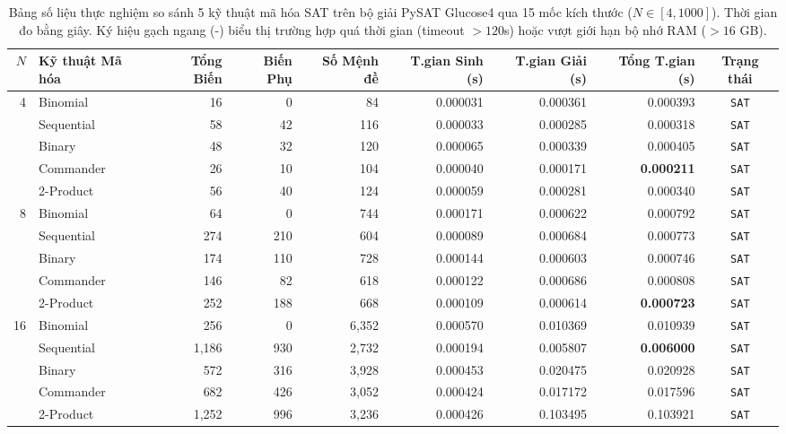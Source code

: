 \documentclass[a4paper,fleqn]{cas-sc}
\begin{document}
\begin{table}[t]
\centering
\caption{Bảng số liệu thực nghiệm so sánh 5 kỹ thuật mã hóa SAT trên bộ giải PySAT Glucose4 qua 15 mốc kích thước ($N \in [4, 1000]$). Thời gian đo bằng giây. Ký hiệu gạch ngang (-) biểu thị trường hợp quá thời gian (timeout $> 120$s) hoặc vượt giới hạn bộ nhớ RAM ($> 16$ GB).}
\label{tab:sat_encodings_results}
\scriptsize
\setlength{\tabcolsep}{3.5pt}
\begin{tabular*}{\textwidth}{@{\extracolsep{\fill}} r l r r r r r r c @{}}
\toprule
$N$ & \textbf{Kỹ thuật Mã hóa} & \textbf{Tổng Biến} & \textbf{Biến Phụ} & \textbf{Số Mệnh đề} & \textbf{T.gian Sinh (s)} & \textbf{T.gian Giải (s)} & \textbf{Tổng T.gian (s)} & \textbf{Trạng thái} \\
\midrule
\multirow{5}{*}{4} 
 & Binomial & 16 & 0 & 84 & 0.000031 & 0.000361 & 0.000393 & \texttt{SAT} \\
 & Sequential & 58 & 42 & 116 & 0.000033 & 0.000285 & 0.000318 & \texttt{SAT} \\
 & Binary & 48 & 32 & 120 & 0.000065 & 0.000339 & 0.000405 & \texttt{SAT} \\
 & Commander & 26 & 10 & 104 & 0.000040 & 0.000171 & \textbf{0.000211} & \texttt{SAT} \\
 & 2-Product & 56 & 40 & 124 & 0.000059 & 0.000281 & 0.000340 & \texttt{SAT} \\
\midrule
\multirow{5}{*}{8} 
 & Binomial & 64 & 0 & 744 & 0.000171 & 0.000622 & 0.000792 & \texttt{SAT} \\
 & Sequential & 274 & 210 & 604 & 0.000089 & 0.000684 & 0.000773 & \texttt{SAT} \\
 & Binary & 174 & 110 & 728 & 0.000144 & 0.000603 & 0.000746 & \texttt{SAT} \\
 & Commander & 146 & 82 & 618 & 0.000122 & 0.000686 & 0.000808 & \texttt{SAT} \\
 & 2-Product & 252 & 188 & 668 & 0.000109 & 0.000614 & \textbf{0.000723} & \texttt{SAT} \\
\midrule
\multirow{5}{*}{16} 
 & Binomial & 256 & 0 & 6,352 & 0.000570 & 0.010369 & 0.010939 & \texttt{SAT} \\
 & Sequential & 1,186 & 930 & 2,732 & 0.000194 & 0.005807 & \textbf{0.006000} & \texttt{SAT} \\
 & Binary & 572 & 316 & 3,928 & 0.000453 & 0.020475 & 0.020928 & \texttt{SAT} \\
 & Commander & 682 & 426 & 3,052 & 0.000424 & 0.017172 & 0.017596 & \texttt{SAT} \\
 & 2-Product & 1,252 & 996 & 3,236 & 0.000426 & 0.103495 & 0.103921 & \texttt{SAT} \\

\end{tabular*}
\end{table}
\end{document}
